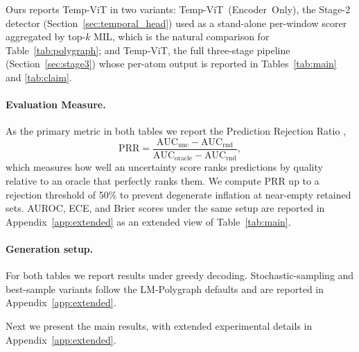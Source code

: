 Ours reports Temp-ViT in two variants:
Temp-ViT~(Encoder~Only), the Stage-2 detector
(Section~\ref{sec:temporal_head}) used as a stand-alone per-window
scorer aggregated by top-$k$ MIL, which is the natural comparison for
Table~\ref{tab:polygraph}; and Temp-ViT, the full
three-stage pipeline (Section~\ref{sec:stage3}) whose per-atom output
is reported in Tables~\ref{tab:main} and \ref{tab:claim}.

\paragraph{Evaluation Measure.} As the primary metric in both tables
we report the Prediction Rejection Ratio
\citep{malinin2021uncertainty},
\begin{equation}
    \mathrm{PRR} = \frac{\mathrm{AUC}_{\mathrm{unc}} - \mathrm{AUC}_{\mathrm{rnd}}}{\mathrm{AUC}_{\mathrm{oracle}} - \mathrm{AUC}_{\mathrm{rnd}}},
    \label{eq:prr}
\end{equation}
which measures how well an uncertainty score ranks predictions by
quality relative to an oracle that perfectly ranks them. We compute
PRR up to a rejection threshold of 50\% to prevent degenerate inflation
at near-empty retained sets. AUROC, ECE, and Brier scores under the
same setup are reported in Appendix~\ref{app:extended} as an extended
view of Table~\ref{tab:main}.

\paragraph{Generation setup.} For both tables we report results under
greedy decoding. Stochastic-sampling and best-sample variants follow
the LM-Polygraph defaults and are reported in
Appendix~\ref{app:extended}.

Next we present the main results, with extended experimental details
in Appendix~\ref{app:extended}.
